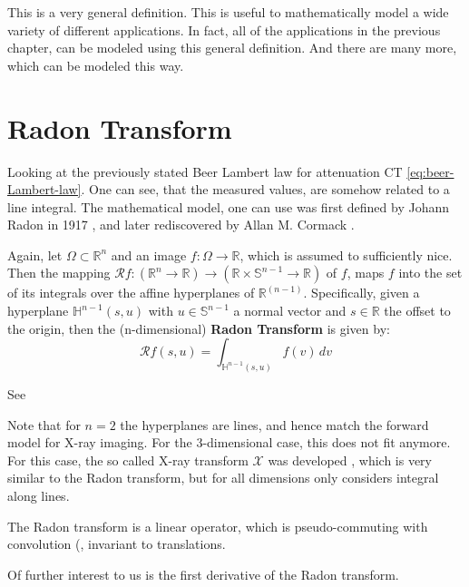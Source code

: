 This is a very general definition. This is useful to mathematically model a wide variety of
different applications. In fact, all of the applications in the previous chapter, can be modeled
using this general definition. And there are many more, which can be modeled this way.

\section{Radon Transform}\label{sec:radon_transform}

Looking at the previously stated Beer Lambert law for attenuation CT \autoref{eq:beer-Lambert-law}.
One can see, that the measured values, are somehow related to a line integral. The mathematical
model, one can use was first defined by Johann Radon in 1917 , and
later rediscovered by Allan M. Cormack .

\begin{definition}
	Again, let \(\Omega \subset \mathbb{R}^n\) and an image \(f\colon \Omega \to \mathbb{R}\),
	which is assumed to sufficiently nice. Then the mapping \(\mathscr{R}f\colon (\mathbb{R}^n
	\to \mathbb{R}) \to (\mathbb{R} \times \mathbb{S}^{n-1} \to \mathbb{R})\) of \(f\), maps
	\(f\) into the set of its integrals over the affine hyperplanes of \(\mathbb{R}^(n-1)\).
	Specifically, given a hyperplane \(\mathbb{H}^{n-1}(s, u)\) with \(u \in \mathbb{S}^{n-1}\)
	a normal vector and \(s \in \mathbb{R}\) the offset to the origin, then the (n-dimensional)
	\textbf{Radon Transform} is given by:
	\[ \mathscr{R}f(s, u) = \int_{\mathbb{H}^{n-1}(s, u)} f(v) \, dv \]

	See 
\end{definition}

Note that for \(n=2\) the hyperplanes are lines, and hence match the forward model for X-ray
imaging. For the 3-dimensional case, this does not fit anymore. For this case, the so called
X-ray transform \(\mathscr{X}\) was developed , which is
very similar to the Radon transform, but for all dimensions only considers integral along lines.

The Radon transform is a linear operator, which is pseudo-commuting with convolution (, invariant to
translations.  

Of further interest to us is the first derivative of the Radon transform.

